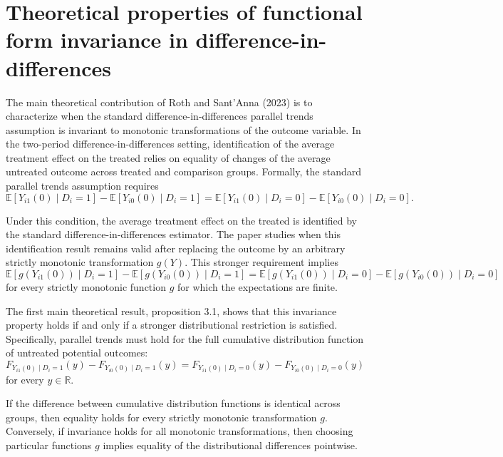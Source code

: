 \documentclass[12pt]{article}
\theoremstyle{remark}
\begin{document}


\section{Theoretical properties of functional form invariance in difference-in-differences}

The main theoretical contribution of Roth and Sant'Anna (2023) is to characterize when the standard difference-in-differences parallel trends assumption is invariant to monotonic transformations of the outcome variable. In the two-period difference-in-differences setting, identification of the average treatment effect on the treated relies on equality of changes of the average untreated outcome across treated and comparison groups. Formally, the standard parallel trends assumption requires
\[
\mathbb{E}[Y_{i1}(0)\mid D_i=1]-\mathbb{E}[Y_{i0}(0)\mid D_i=1]
=
\mathbb{E}[Y_{i1}(0)\mid D_i=0]-\mathbb{E}[Y_{i0}(0)\mid D_i=0].
\]

Under this condition, the average treatment effect on the treated is identified by the standard difference-in-differences estimator. The paper studies when this identification result remains valid after replacing the outcome by an arbitrary strictly monotonic transformation \(g(Y)\). This stronger requirement implies
\[
\mathbb{E}[g(Y_{i1}(0))\mid D_i=1]-\mathbb{E}[g(Y_{i0}(0))\mid D_i=1]
=
\mathbb{E}[g(Y_{i1}(0))\mid D_i=0]-\mathbb{E}[g(Y_{i0}(0))\mid D_i=0]
\]
for every strictly monotonic function \(g\) for which the expectations are finite.

The first main theoretical result, proposition 3.1, shows that this invariance property holds if and only if a stronger distributional restriction is satisfied. Specifically, parallel trends must hold for the full cumulative distribution function of untreated potential outcomes:
\[
F_{Y_{i1}(0)\mid D_i=1}(y)-F_{Y_{i0}(0)\mid D_i=1}(y)
=
F_{Y_{i1}(0)\mid D_i=0}(y)-F_{Y_{i0}(0)\mid D_i=0}(y)
\]
for every \(y \in \mathbb{R}\).

If the difference between cumulative distribution functions is identical across groups, then equality holds for every strictly monotonic transformation \(g\). Conversely, if invariance holds for all monotonic transformations, then choosing particular functions \(g\) implies equality of the distributional differences pointwise.
\end{document}
